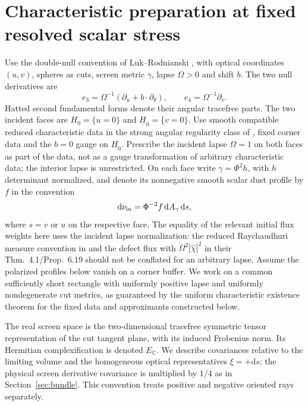 \documentclass[11pt]{article}
\newcommand{\dd}{\mathrm d}
\begin{document}
\section{Characteristic preparation at fixed resolved scalar stress}\label{sec:char}
Use the double-null convention of Luk--Rodnianski \cite{LR}, with optical coordinates $(u,v)$, spheres as cuts, screen metric $\gamma$, lapse $\Omega>0$ and shift $b$. The two null derivatives are
\[
 e_3=\Omega^{-1}(\partial_u+b\cdot\partial_\theta),\qquad
 e_4=\Omega^{-1}\partial_v.
\]
Hatted second fundamental forms denote their angular tracefree parts. The two incident faces are $H_0=\{u=0\}$ and $\underline H_0=\{v=0\}$. Use smooth compatible reduced characteristic data in the strong angular regularity class of \cite[Def.~4.5]{LR}, fixed corner data and the $b=0$ gauge on $\underline H_0$. Prescribe the incident lapse $\Omega=1$ on both faces as part of the data, not as a gauge transformation of arbitrary characteristic data; the interior lapse is unrestricted. On each face write $\gamma=\Phi^2 h$, with $h$ determinant normalized, and denote its nonnegative smooth scalar dust profile by $f$ in the convention
\[
 \dd\nu_{\rm in}=\Phi^{-2} f\,\dd A_\gamma\,\dd s ,
\]
where $s=v$ or $u$ on the respective face. The equality of the relevant initial flux weights here uses the incident lapse normalization: the reduced Raychaudhuri measure convention in \cite[(9.62)]{LR} and the defect flux with $\Omega^2|\widehat\chi|^2$ in their Thm.~4.1/Prop.~6.19 should not be conflated for an arbitrary lapse. Assume the polarized profiles below vanish on a corner buffer. We work on a common sufficiently short rectangle with uniformly positive lapse and uniformly nondegenerate cut metrics, as guaranteed by the uniform characteristic existence theorem for the fixed data and approximants constructed below.

The real screen space is the two-dimensional tracefree symmetric tensor representation of the cut tangent plane, with its induced Frobenius norm. Its Hermitian complexification is denoted $E_{\mathbb C}$. We describe covariances relative to the limiting volume and the homogeneous optical representatives $\xi=+\dd s$; the physical screen derivative covariance is multiplied by $1/4$ as in Section~\ref{sec:bundle}. This convention treats positive and negative oriented rays separately.
\end{document}
